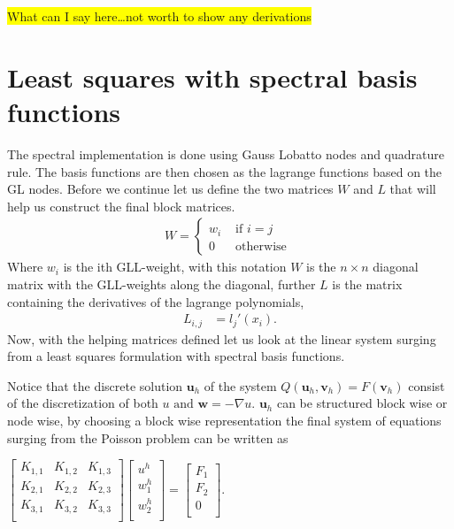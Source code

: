 \colorbox{yellow}{What can I say here\ldots not worth to show any derivations}
\section{Least squares with spectral basis functions}

The spectral implementation is done using Gauss Lobatto nodes and quadrature rule. The basis functions are then chosen as the lagrange functions based on the GL nodes. Before we continue let us define the two matrices $W$ and $L$ that will help us construct the final block matrices.
%
\begin{align}
	W = \left\{
		\begin{array}{lr}
			w_i & \text{ if } i = j \\
			0 & \text{ otherwise }
		\end{array}
		\right.
	\label{eq:Wdef}
\end{align}
%
Where $w_i$ is the ith GLL-weight, with this notation $W$ is the $n \times n$ diagonal matrix with the GLL-weights along the diagonal, further $L$ is the matrix containing the derivatives of the lagrange polynomials,  
%
\begin{align}
	L_{i,j} &= l_j'(x_i).
	\label{eq:HelpMatrices}
\end{align}
%
Now, with the helping matrices defined let us look at the linear system surging from a least squares formulation with spectral basis functions. 

Notice that the discrete solution $\mathbf{u}_h$ of the system $Q(\mathbf{u}_h,\mathbf{v}_h) = F(\mathbf{v}_h)$ consist of the discretization of both $u \text{ and } \mathbf{w} = - \nabla u$. $\mathbf{u}_h$ can be structured block wise or node wise, by choosing a block wise representation the final system of equations surging from the Poisson problem can be written as 

$
\begin{bmatrix}
	K_{1,1} & K_{1,2} &	K_{1,3} \\ 	
	K_{2,1} & K_{2,2} & K_{2,3} \\ 	
	K_{3,1} & K_{3,2} & K_{3,3} \\ 	
\end{bmatrix}
\begin{bmatrix}
 u^h \\ 	
 w^h_1\\ 	
 w^h_2\\ 	
\end{bmatrix}
=
\begin{bmatrix}
 F_1 \\ 	
 F_2\\ 	
 0 \\ 	
\end{bmatrix}
$.

